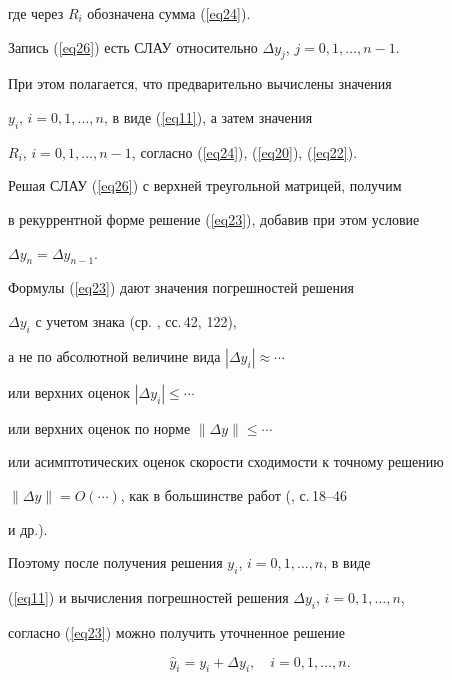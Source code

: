 \begin{pf}
где через $R_i$ обозначена сумма (\ref{eq24}).


Запись (\ref{eq26}) есть СЛАУ относительно $\Delta y_j$, $j=0,1,\dotsc,n-1$.


При этом полагается, что предварительно вычислены значения


$y_i$, $i=0,1,\dotsc,n$, в виде (\ref{eq11}), а затем значения


$R_i$, $i=0,1,\dotsc,n-1$, согласно (\ref{eq24}), (\ref{eq20}), (\ref{eq22}).


Решая СЛАУ (\ref{eq26}) с верхней треугольной матрицей, получим


в рекуррентной форме решение (\ref{eq23}), добавив при этом условие


$\Delta y_n=\Delta y_{n-1}$.


\end{pf}





\begin{note}


Формулы (\ref{eq23}) дают значения погрешностей решения


$\Delta y_i$ с учетом знака (ср. \cite{vs}, сс.\,42, 122),


а не по абсолютной величине вида $|\Delta y_i|\approx\dotsb$


или верхних оценок $|\Delta y_i|\le\dotsb$


или верхних оценок по норме $\|\Delta y\|\le\dotsb$


или асимптотических оценок скорости сходимости к точному решению


$\|\Delta y\|=O(\dotsb)$, как в большинстве работ (\cite{gab}, с.\,18--46


и др.).


Поэтому после получения решения $y_i$, $i=0,1,\dotsc,n$, в виде


(\ref{eq11}) и вычисления погрешностей решения $\Delta y_i$, $i=0,1,\dotsc,n$,


согласно (\ref{eq23}) можно получить уточненное решение


\begin{equation}


\label{eq27}


\widehat y_i=y_i+\Delta y_i, \quad i=0,1,\dotsc,n.


\end{equation}


\end{note}








